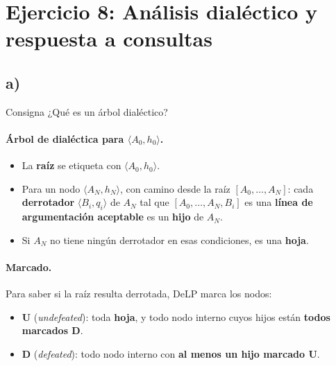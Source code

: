 \documentclass[11pt,a4paper]{article}
\begin{document}
\section{Ejercicio 8: Análisis dialéctico y respuesta a consultas}


\subsection{a)}

\begin{enunciado}{Consigna}
¿Qué es un árbol dialéctico?
\end{enunciado}

\paragraph{Árbol de dialéctica para $\langle A_0, h_0\rangle$.}
\begin{itemize}
  \item La \textbf{raíz} se etiqueta con $\langle A_0, h_0\rangle$.
  \item Para un nodo $\langle A_N, h_N\rangle$, con camino desde la raíz $[A_0, \dots, A_N]$: cada \textbf{derrotador} $\langle B_i, q_i\rangle$ de $A_N$ tal que $[A_0, \dots, A_N, B_i]$ es una \textbf{línea de argumentación aceptable} es un \textbf{hijo} de $A_N$.
  \item Si $A_N$ no tiene ningún derrotador en esas condiciones, es una \textbf{hoja}.
\end{itemize}

\paragraph{Marcado.} Para saber si la raíz resulta derrotada, DeLP marca los nodos:
\begin{itemize}
  \item \textbf{U} (\textit{undefeated}): toda \textbf{hoja}, y todo nodo interno cuyos hijos están \textbf{todos marcados D}.
  \item \textbf{D} (\textit{defeated}): todo nodo interno con \textbf{al menos un hijo marcado U}.
\end{itemize}
\end{document}
